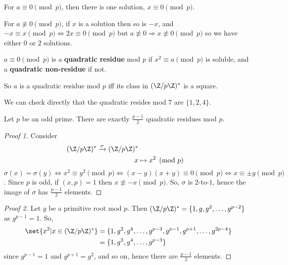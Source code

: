 \documentclass{article}
\begin{document}
For $a \equiv 0 \pmod{p}$, then there is one solution, $x \equiv 0 \pmod{p}$.

For $a \not \equiv 0 \pmod{p}$, if $x$ is a solution then so is $-x$, and $-x \equiv x \pmod{p} \Leftrightarrow 2x \equiv 0 \pmod{p}$ but $a \not\equiv 0 \Rightarrow x \not\equiv 0 \pmod{p}$ so we have either $0$ or $2$ solutions.

\begin{defi}
    $a \equiv 0 \pmod{p}$ is a \textbf{quadratic residue} mod $p$ if $x^2 \equiv a \pmod{p}$ is soluble, and a \textbf{quadratic non-residue} if not.
\end{defi}


So $a$ is a quadratic residue mod $p$ iff its class in $(\Z / p \Z)^*$ is a square.


We can check directly that %
the quadratic resides mod $7$ are $\{1, 2, 4\}$.

\begin{nlemma}\label{lem:3.1}
    Let $p$ be an odd prime. There are exactly $\frac{p-1}{2}$ quadratic residues mod $p$.
\end{nlemma}

\begin{proof}[Proof 1]
    Consider
    \begin{align*}
        (\Z / p \Z)^* \xrightarrow{\sigma} (\Z/p\Z)^* \\
        x &\mapsto x^2 \pmod{p}
    \end{align*}
    $\sigma(x) = \sigma(y) \iff x^2 \equiv y^2 \pmod{p} \iff (x-y)(x+y) \equiv 0 \pmod{p} \iff x \equiv \pm y \pmod{p}$.
    Since $p$ is odd, if $(x, p) = 1$ then $x \not\equiv -x \pmod{p}$. So, $\sigma$ is $2$-to-$1$, hence the image of $\sigma$ has $\frac{p-1}{2}$ elements.
\end{proof}

\begin{proof}[Proof 2]
    Let $g$ be a primitive root mod $p$. Then $(\Z / p \Z)^* = \{1, g, g^2, \dotsc, g^{p-2}\}$ as $g^{p-1} = 1$.
    So,
    \begin{align*}
        \set{x^2 | x \in (\Z / p\Z)^*} &= \{1, g^2, g^4, \dotsc, g^{p-3}, g^{p-1}, g^{p+1}, \dotsc, g^{2p-4}\} \\
                                      &= \{1, g^2, g^4, \dotsc, g^{p-3}\}
    \end{align*}
    since $g^{p-1} = 1$ and $g^{p+1} = g^2$, and so on, hence there are $\frac{p-1}{2}$ elements.
\end{proof}
\end{document}
